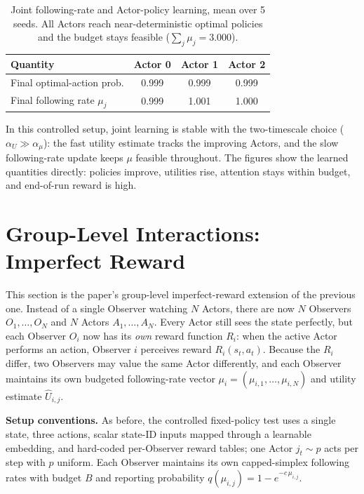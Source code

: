 \documentclass[11pt]{article}
\newcommand{\reportprob}{q}
\begin{document}
\begin{table}[H]
\centering
\small
\begin{tabular}{lccc}
\toprule
Quantity & Actor 0 & Actor 1 & Actor 2 \\
\midrule
Final optimal-action prob.        & 0.999 & 0.999 & 0.999 \\
Final following rate \(\mu_j\)    & 0.999 & 1.001 & 1.000 \\
\bottomrule
\end{tabular}
\caption{Joint following-rate and Actor-policy learning, mean over 5 seeds.
All Actors reach
near-deterministic optimal policies and the budget stays feasible
(\(\sum_j\mu_j=3.000\)).}
\label{tab:section4-joint}
\end{table}

In this controlled setup, joint learning is stable with the two-timescale choice
(\(\alpha_U\gg\alpha_\mu\)): the fast utility estimate tracks the improving
Actors, and the slow following-rate update keeps \(\mu\) feasible throughout.
The figures show the learned quantities directly: policies improve, utilities
rise, attention stays within budget, and end-of-run reward is high.

\section{Group-Level Interactions: Imperfect Reward}

This section is the paper's group-level imperfect-reward extension of the
previous one. Instead of a single Observer watching \(N\) Actors, there are now
\(N\) Observers
\(O_1,\dots,O_N\) and \(N\) Actors \(A_1,\dots,A_N\). Every Actor still sees the
state perfectly, but each Observer \(O_i\) now has its \emph{own} reward function
\(R_i\): when the active Actor performs an action, Observer \(i\) perceives
reward \(R_i(s_t,a_t)\). Because the \(R_i\) differ, two Observers may value the
same Actor differently, and each Observer maintains its own budgeted
following-rate vector \(\mu_i=(\mu_{i,1},\dots,\mu_{i,N})\) and utility estimate
\(\hat U_{i,j}\).

\textbf{Setup conventions.} As before, the controlled fixed-policy test uses a
single state, three actions, scalar state-ID inputs mapped through a learnable
embedding, and hard-coded per-Observer reward tables; one Actor \(j_t\sim p\)
acts per step with \(p\) uniform. Each Observer maintains its own
capped-simplex following rates with budget \(B\) and reporting probability
\(\reportprob(\mu_{i,j})=1-e^{-c\,\mu_{i,j}}\).
\end{document}
